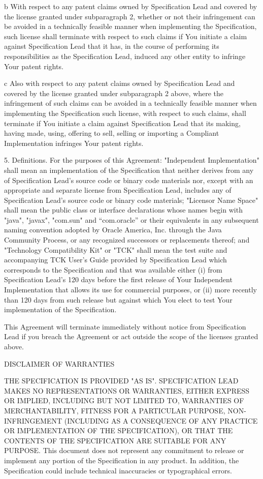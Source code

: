 	b  With respect to any patent claims owned by Specification Lead and covered by the license granted under subparagraph 2, whether or not their infringement can be avoided in a technically feasible manner when implementing the Specification, such license shall terminate with respect to such claims if You initiate a claim against Specification Lead that it has, in the course of performing its responsibilities as the Specification Lead, induced any other entity to infringe Your patent rights.

	c  Also with respect to any patent claims owned by Specification Lead and covered by the license granted under subparagraph 2 above, where the infringement of such claims can be avoided in a technically feasible manner when implementing the Specification such license, with respect to such claims, shall terminate if You initiate a claim against Specification Lead  that its making, having made, using, offering to sell, selling or importing a Compliant Implementation infringes Your patent rights.

5. Definitions. For the purposes of this Agreement:  "Independent Implementation" shall mean an implementation of the Specification that neither derives from any of Specification Lead's  source code or binary code materials nor, except with an appropriate and separate license from Specification Lead, includes any of Specification Lead's  source code or binary code materials; "Licensor Name Space" shall mean the public class or interface declarations whose names begin with "java", "javax", "com.sun" and “com.oracle”  or their equivalents in any subsequent naming convention adopted by Oracle America, Inc. through the Java Community Process, or any recognized successors or replacements thereof; and "Technology Compatibility Kit" or "TCK" shall mean the test suite and accompanying TCK User's Guide provided by Specification Lead  which corresponds to the Specification and that was available either (i) from Specification Lead's 120 days before the first release of Your Independent Implementation that allows its use for commercial purposes, or (ii) more recently than 120 days from such release but against which You elect to test Your implementation of the Specification.

This Agreement will terminate immediately without notice from Specification Lead if you breach the Agreement or act outside the scope of the licenses granted above.

DISCLAIMER OF WARRANTIES 

THE SPECIFICATION IS PROVIDED "AS IS". SPECIFICATION LEAD MAKES NO REPRESENTATIONS OR WARRANTIES, EITHER EXPRESS OR IMPLIED, INCLUDING BUT NOT LIMITED TO, WARRANTIES OF MERCHANTABILITY, FITNESS FOR A PARTICULAR PURPOSE, NON-INFRINGEMENT (INCLUDING AS A CONSEQUENCE OF ANY PRACTICE OR IMPLEMENTATION OF THE SPECIFICATION), OR THAT THE CONTENTS OF THE SPECIFICATION ARE SUITABLE FOR ANY PURPOSE.  This document does not represent any commitment to release or implement any portion of the Specification in any product. In addition, the Specification could include technical inaccuracies or typographical errors.

